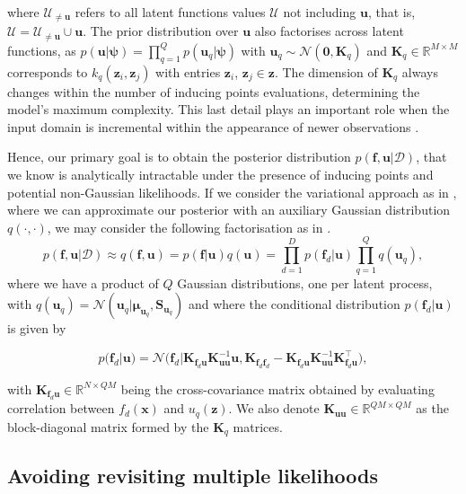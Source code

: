\documentclass[]{article}
\def\K{{\mathbf K}}
\def\S{{\mathbf S}}
\def\x{{\mathbf x}}
\def\z{{\mathbf z}}
\def\u{{\mathbf u}}
\def\f{{\mathbf f}}
\newcommand{\Ucal}{\mathcal{U}}
\newcommand{\Dcal}{\mathcal{D}}
\newcommand{\zc}{\bm{z}}
\begin{document}
where $\Ucal_{\neq\u}$ refers to all latent functions values $\Ucal$ not including $\u$, that is, $\Ucal = \Ucal_{\neq\u} \cup \u$. The prior distribution over $\u$ also factorises across latent functions, as $p(\u|\bm{\psi}) = \prod_{q=1}^{Q}p(\u_q|\bm{\psi})$ with $\u_q \sim \mathcal{N}(\bm{0},\K_q)$ and $\K_q \in \mathbb{R}^{M \times M}$ corresponds to $k_q(\zc_i, \zc_j)$ with entries $\zc_i$, $\zc_j \in \zc$.  The dimension of $\K_q$ always changes within the number of inducing points evaluations, determining the model's maximum complexity. This last detail plays an important role when the input domain is incremental within the appearance of newer observations \citep{burt2019rates}.




Hence, our primary goal is to obtain the posterior distribution $p(\f,\u| \Dcal)$, that we know is analytically intractable under the presence of inducing points and potential non-Gaussian likelihoods. If we consider the variational approach as in \citet{titsias2009variational}, where we can approximate our posterior with an auxiliary Gaussian distribution $q(\cdot, \cdot)$, we may consider the following factorisation as in \citet{alvarez2010efficient}.
\begin{equation*}
p(\f,\u|\Dcal) \approx q(\f,\u) = p(\f|\u)q(\u) 
= \prod_{d=1}^{D}p(\f_{d}|\u)\prod^Q_{q=1}q(\u_q),
\end{equation*}
where we have a product of $Q$ Gaussian distributions, one per latent process, with $q(\mathbf{u}_q) =\mathcal{N}(\u_q|\bm{\mu}_{\u_q}, \S_{\u_q})$ and where the conditional distribution $p(\f_d|\u)$ is given by

\begin{equation*}
p(\f_d|\u)  
= \mathcal{N}\Big(\f_{d}|\K_{\mathbf{f}_{d}\u}\mathbf{K}^{-1}_{\u\u}\u, \mathbf{K}_{\f_{d}\f_{d}}  - \mathbf{K}_{\f_{d}\u}\K^{-1}_{\u\u}\K^{\top}_{\f_{d}\u}  \Big),
\end{equation*}

with $\K_{\f_{d}\u} \in \mathbb{R}^{N\times QM}$ being the cross-covariance matrix obtained by evaluating correlation between $f_d(\x)$ and $u_q(\z)$. We also denote $\K_{\u\u}\in \mathbb{R}^{QM\times QM}$ as the block-diagonal matrix formed by the $\K_q$ matrices.

\subsection{Avoiding revisiting multiple likelihoods}
\end{document}
